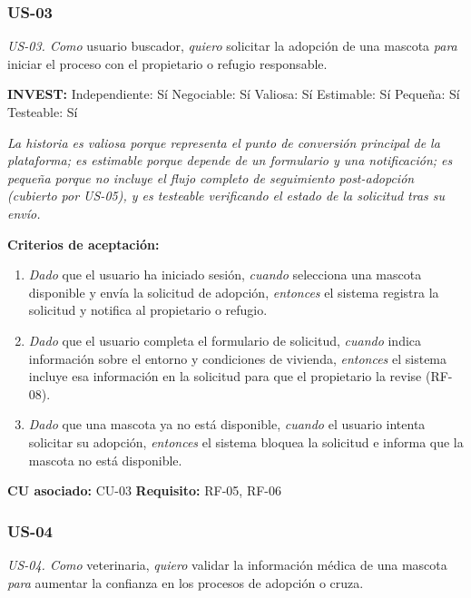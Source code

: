 \documentclass[journal,onecolumn]{IEEEtran}
\begin{document}
\subsubsection{US-03}

\begin{mdframed}[style=guia]
\textit{US-03. Como} usuario buscador, \textit{quiero} solicitar la
adopción de una mascota \textit{para} iniciar el proceso con el propietario
o refugio responsable.
\end{mdframed}

\textbf{INVEST:} Independiente: Sí \quad Negociable: Sí \quad
Valiosa: Sí \quad Estimable: Sí \quad
Pequeña: Sí \quad Testeable: Sí

\textit{La historia es valiosa porque representa el punto de conversión
principal de la plataforma; es estimable porque depende de un formulario y
una notificación; es pequeña porque no incluye el flujo completo de
seguimiento post-adopción (cubierto por US-05), y es testeable verificando
el estado de la solicitud tras su envío.}

\textbf{Criterios de aceptación:}
\begin{enumerate}[leftmargin=*]
  \item \textit{Dado} que el usuario ha iniciado sesión, \textit{cuando}
  selecciona una mascota disponible y envía la solicitud de adopción,
  \textit{entonces} el sistema registra la solicitud y notifica al
  propietario o refugio.
  \item \textit{Dado} que el usuario completa el formulario de solicitud,
  \textit{cuando} indica información sobre el entorno y condiciones de
  vivienda, \textit{entonces} el sistema incluye esa información en la
  solicitud para que el propietario la revise (RF-08).
  \item \textit{Dado} que una mascota ya no está disponible, \textit{cuando}
  el usuario intenta solicitar su adopción, \textit{entonces} el sistema
  bloquea la solicitud e informa que la mascota no está disponible.
\end{enumerate}
\textbf{CU asociado:} CU-03 \quad \textbf{Requisito:} RF-05, RF-06

\subsubsection{US-04}

\begin{mdframed}[style=guia]
\textit{US-04. Como} veterinaria, \textit{quiero} validar la información
médica de una mascota \textit{para} aumentar la confianza en los procesos
de adopción o cruza.
\end{mdframed}
\end{document}
